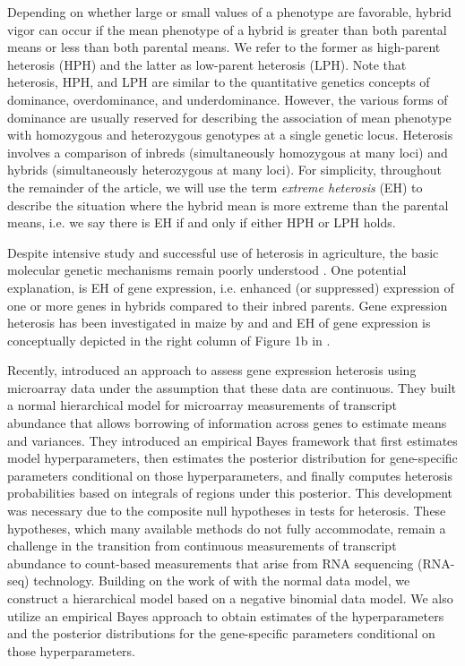\documentclass[useAMS,usenatbib,referee]{biom}
\newcommand{\RNAseq}{RNA-seq}
\begin{document}
Depending on whether large or small values of a phenotype are favorable, hybrid vigor can occur if the mean phenotype of a hybrid is greater than both parental means or less than both parental means. We refer to the former as high-parent heterosis (HPH) and the latter as low-parent heterosis (LPH). Note that heterosis, HPH, and LPH are similar to the quantitative genetics concepts of dominance, overdominance, and underdominance.  However, the various forms of dominance are usually reserved for describing the association of mean phenotype with homozygous and heterozygous genotypes at a single genetic locus.  Heterosis involves a comparison of inbreds (simultaneously homozygous at many loci) and hybrids (simultaneously heterozygous at many loci).  For simplicity, throughout the remainder of the article, we will use the term \emph{extreme heterosis} (EH) to describe the situation where the hybrid mean is more extreme than the parental means, i.e. we say there is EH if and only if either HPH or LPH holds.

Despite intensive study and successful use of heterosis in agriculture, the basic molecular genetic mechanisms remain poorly understood \citep{chen2013genomic}. One potential explanation, is EH of gene expression, i.e. enhanced (or suppressed) expression of one or more genes in hybrids compared to their inbred parents.  Gene expression heterosis has been investigated in maize by \cite{swanson2006all} and \cite{springer2007allelic} and EH of gene expression is conceptually depicted in the right column of Figure 1b in \cite{chen2013genomic}.

Recently, \cite{ji2014estimation} introduced an approach to assess gene expression heterosis using microarray data under the assumption that these data are continuous. They built a normal hierarchical model for microarray measurements of transcript abundance that allows borrowing of information across genes to estimate means and variances. They introduced an empirical Bayes framework that first estimates model hyperparameters, then estimates the posterior distribution for gene-specific parameters conditional on those hyperparameters, and finally computes heterosis probabilities based on integrals of regions under this posterior. This development was necessary due to the composite null hypotheses in tests for heterosis. These hypotheses, which many available methods do not fully accommodate, remain a challenge in the transition from continuous measurements of transcript abundance to count-based measurements that arise from RNA sequencing (\RNAseq{}) technology. Building on the work of \citeauthor{ji2014estimation} with the normal data model, we construct a hierarchical model based on a negative binomial data model. We also utilize an empirical Bayes approach to obtain estimates of the hyperparameters and the posterior distributions for the gene-specific parameters conditional on those hyperparameters. 
\end{document}
